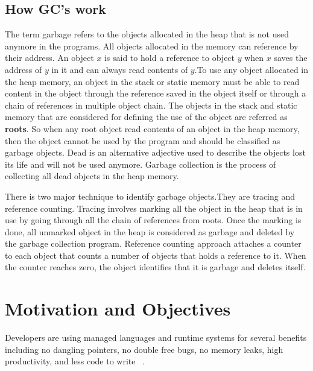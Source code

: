 \subsection{How GC's work}
The term garbage refers to the objects allocated in the heap that is not used anymore in the programs. All objects allocated in the memory can reference by their address. An object $x$ is said to hold a reference to object $y$ when $x$ saves the address of $y$ in it and can always read contents of $y$.To use any object allocated in the heap memory, an object in the stack or static memory must be able to read content in the object through the reference saved in the object itself or through a chain of references in multiple object chain.
The objects in the stack and static memory that are considered for defining the use of the object are referred as \textbf{roots}.
So when any root object read contents of an object in the heap memory, then the object cannot be used by the program and should be classified as garbage objects. Dead is an alternative adjective used to describe the objects lost its life and will not be used anymore. Garbage collection is the process of collecting all dead objects in the heap memory. 

There is two major technique to identify garbage objects.They are tracing and reference counting. Tracing involves marking all the object in the heap that is in use by going through all the chain of references from roots. Once the marking is done, all unmarked object in the heap is considered as garbage and deleted by the garbage collection program. Reference counting approach attaches a counter to each object that counts a number of objects that holds a reference to it. When the counter reaches zero, the object identifies that it is garbage and deletes itself.

\section{Motivation and Objectives}
\label{intro:motv}
Developers are using managed languages and runtime systems for several benefits including no dangling pointers, no double free bugs, no memory leaks, high productivity, and less code to write ~\cite{Butters}.  
\begin{comment}
The main advantage of the garbage collections are 
\begin{enumerate}
\item Dangling Pointers
\item Double free bugs
\item Memory Leaks
\end{enumerate}
\end{comment}

